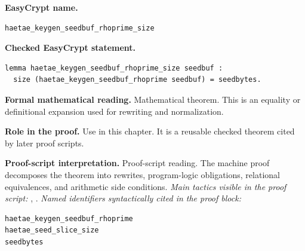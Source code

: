 \begin{formaltheorem}
\noindent\textbf{EasyCrypt name.}
\begin{lstlisting}[language=EasyCrypt,basicstyle=\ttfamily\scriptsize]
haetae_keygen_seedbuf_rhoprime_size
\end{lstlisting}
\noindent\textbf{Checked EasyCrypt statement.}
\begin{lstlisting}[language=EasyCrypt,basicstyle=\ttfamily\scriptsize]
lemma haetae_keygen_seedbuf_rhoprime_size seedbuf :
  size (haetae_keygen_seedbuf_rhoprime seedbuf) = seedbytes.
\end{lstlisting}
\noindent\textbf{Formal mathematical reading.}
Mathematical theorem. This is an equality or definitional expansion used for rewriting and normalization.

\noindent\textbf{Role in the proof.}
Use in this chapter. It is a reusable checked theorem cited by later proof scripts.

\noindent\textbf{Proof-script interpretation.}
Proof-script reading. The machine proof decomposes the theorem into rewrites, program-logic obligations, relational equivalences, and arithmetic side conditions.
\emph{Main tactics visible in the proof script:} , .
\emph{Named identifiers syntactically cited in the proof block:}
\begin{lstlisting}[language=EasyCrypt,basicstyle=\ttfamily\scriptsize]
haetae_keygen_seedbuf_rhoprime
haetae_seed_slice_size
seedbytes
\end{lstlisting}

\end{formaltheorem}

